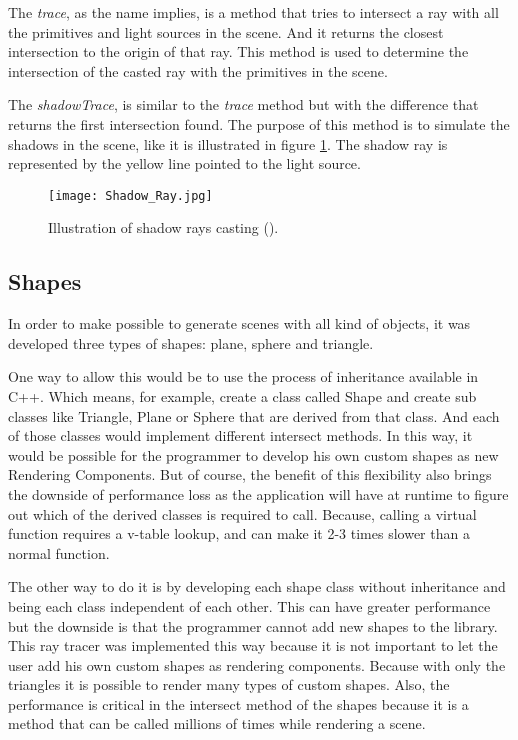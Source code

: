 \par
The \textit{trace}, as the name implies, is a method that tries to intersect a ray with all the primitives and light sources in the scene.
And it returns the closest intersection to the origin of that ray.
This method is used to determine the intersection of the casted ray with the primitives in the scene.

\par
The \textit{shadowTrace}, is similar to the \textit{trace} method but with the difference that returns the first intersection found.
The purpose of this method is to simulate the shadows in the scene, like it is illustrated in figure \ref{Illustration of shadow rays casting.}.
The shadow ray is represented by the yellow line pointed to the light source.

\begin{figure}[H]
	\centering
	\caption{Illustration of shadow rays casting (\cite{ShadowRays}).}
	\label{Illustration of shadow rays casting.}
	\texttt{[image: Shadow\_Ray.jpg]}
\end{figure}


\subsection{Shapes}

\par
In order to make possible to generate scenes with all kind of objects, it was developed three types of shapes: plane, sphere and triangle.

\par
One way to allow this would be to use the process of inheritance available in C++.
Which means, for example, create a class called Shape and create sub classes like Triangle, Plane or Sphere that are derived from that class.
And each of those classes would implement different intersect methods.
In this way, it would be possible for the programmer to develop his own custom shapes as new Rendering Components.
But of course, the benefit of this flexibility also brings the downside of performance loss as the application will have at runtime to figure out which of the derived classes is required to call.
Because, calling a virtual function requires a v-table lookup, and can make it 2-3 times slower than a normal function.

\par
The other way to do it is by developing each shape class without inheritance and being each class independent of each other.
This can have greater performance but the downside is that the programmer cannot add new shapes to the library.
This ray tracer was implemented this way because it is not important to let the user add his own custom shapes as rendering components.
Because with only the triangles it is possible to render many types of custom shapes.
Also, the performance is critical in the intersect method of the shapes because it is a method that can be called millions of times while rendering a scene.

